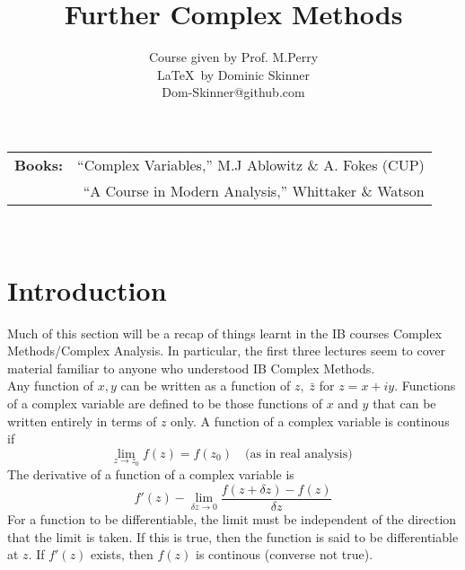 \documentclass{article}
\begin{document}
\title{Further Complex Methods}
\author{Course given by Prof. M.Perry \\
\LaTeX\  by Dominic Skinner \\
Dom-Skinner@github.com}
\maketitle
\begin{tabular}{lr}
\textbf{Books:} & ``Complex Variables,'' M.J Ablowitz \& A. Fokes (CUP)\\
& ``A Course in Modern Analysis,'' Whittaker \& Watson
\end{tabular}
\\
\section*{Introduction}
Much of this section will be a recap of things learnt in the IB courses
Complex Methods/Complex Analysis. In particular, the first three lectures
seem to cover material familiar to anyone who understood IB Complex Methods.
\\

Any function of $x,y$ can be written as a function of $z , \;\bar{z}$ for
$z = x+iy$.
Functions of a complex variable are defined to be those functions of $x$ and
$y$ that can be written entirely in terms of $z$ only.
A function of a complex variable is continous if
\[ \lim_{z \to z_0} f(z) = f(z_0) \quad \mbox{(as in real analysis) } \]
The derivative of a function of a complex variable is
\[ f'(z) - \lim_{\delta z \to 0} \frac{f(z+ \delta z) - f(z)}{\delta z} \]
For a function to be differentiable, the limit must be independent of
the direction that the limit is taken.
If this is true, then the function is said to be differentiable at $z$.
If $f'(z)$ exists, then $f(z)$ is continous (converse not true).
%
%
\end{document}
